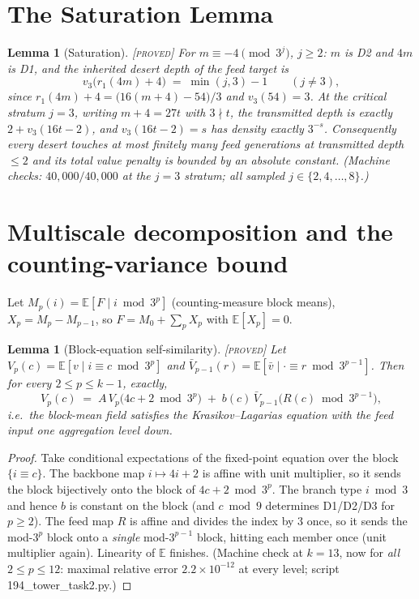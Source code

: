 \documentclass[11pt]{article}
\newtheorem{lemma}[theorem]{Lemma}
\theoremstyle{definition}
\newcommand{\PROVED}{\textup{[\textsc{proved}]}}
\newcommand{\E}{\mathbb{E}}
\begin{document}
\section{The Saturation Lemma}

\begin{lemma}[Saturation]\label{lem:sat} \PROVED{}
For $m \equiv -4 \pmod{3^j}$, $j \ge 2$: $m$ is D2 and $4m$ is D1, and the
inherited desert depth of the feed target is
\[
v_3\big(r_1(4m) + 4\big) \;=\; \min(j, 3) - 1 \qquad (j \ne 3),
\]
since $r_1(4m)+4 = \big(16(m+4) - 54\big)/3$ and $v_3(54) = 3$. At the critical
stratum $j = 3$, writing $m+4 = 27t$ with $3 \nmid t$, the transmitted depth is
exactly $2 + v_3(16t-2)$, and $v_3(16t-2) = s$ has density exactly $3^{-s}$.
Consequently every desert touches at most finitely many feed generations at
transmitted depth $\le 2$ and its total value penalty is bounded by an absolute
constant. (Machine checks: $40{,}000/40{,}000$ at the $j=3$ stratum; all sampled
$j \in \{2,4,\dots,8\}$.)
\end{lemma}

\section{Multiscale decomposition and the counting-variance bound}

Let $M_p(i) = \E[F \mid i \bmod 3^p]$ (counting-measure block means),
$X_p = M_p - M_{p-1}$, so $F = M_0 + \sum_p X_p$ with $\E[X_p] = 0$.

\begin{lemma}[Block-equation self-similarity]\label{lem:block} \PROVED{}
Let $V_p(c) = \E[v \mid i \equiv c \bmod 3^p]$ and
$\bar V_{p-1}(r) = \E[\bar v \mid \cdot \equiv r \bmod 3^{p-1}]$. Then for
every $2 \le p \le k-1$, exactly,
\[
V_p(c) \;=\; A\,V_p\big(4c{+}2 \bmod 3^p\big) \;+\;
b(c)\,\bar V_{p-1}\big(R(c) \bmod 3^{p-1}\big),
\]
i.e.\ \emph{the block-mean field satisfies the Krasikov--Lagarias equation
with the feed input one aggregation level down.}
\end{lemma}
\begin{proof}
Take conditional expectations of the fixed-point equation over the block
$\{i \equiv c\}$. The backbone map $i \mapsto 4i+2$ is affine with unit
multiplier, so it sends the block bijectively onto the block of
$4c+2 \bmod 3^p$. The branch type $i \bmod 3$ and hence $b$ is constant on
the block (and $c \bmod 9$ determines D1/D2/D3 for $p \ge 2$). The feed map
$R$ is affine and divides the index by $3$ once, so it sends the mod-$3^p$
block onto a \emph{single} mod-$3^{p-1}$ block, hitting each member once
(unit multiplier again). Linearity of $\E$ finishes.
(Machine check at $k=13$, now for \emph{all} $2 \le p \le 12$: maximal
relative error $2.2\times 10^{-12}$ at every level; script
194\_tower\_task2.py.)
\end{proof}
\end{document}
